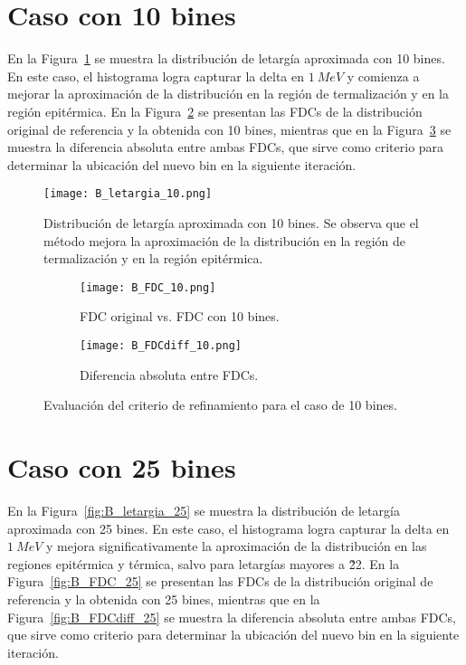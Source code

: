 \section*{Caso con 10 bines}

En la Figura~\ref{fig:B_letargia_10} se muestra la distribución de letargía aproximada con 10 bines. En este caso, el histograma logra capturar la delta en $1~MeV$ y comienza a mejorar la aproximación de la distribución en la región de termalización y en la región epitérmica. En la Figura~\ref{fig:B_FDC_10} se presentan las FDCs de la distribución original de referencia y la obtenida con 10 bines, mientras que en la Figura~\ref{fig:B_FDCdiff_10} se muestra la diferencia absoluta entre ambas FDCs, que sirve como criterio para determinar la ubicación del nuevo bin en la siguiente iteración.

\begin{figure}[H]
    \centering
    \texttt{[image: B\_letargia\_10.png]}
    \caption{Distribución de letargía aproximada con 10 bines. Se observa que el método mejora la aproximación de la distribución en la región de termalización y en la región epitérmica.}
    \label{fig:B_letargia_10}
\end{figure}

\begin{figure}[H]
    \centering
    \begin{subfigure}[b]{0.46\textwidth}
        \texttt{[image: B\_FDC\_10.png]}
        \caption{FDC original vs. FDC con 10 bines.}
        \label{fig:B_FDC_10}
    \end{subfigure}
    \hfill
    \begin{subfigure}[b]{0.46\textwidth}
        \texttt{[image: B\_FDCdiff\_10.png]}
        \caption{Diferencia absoluta entre FDCs.}
        \label{fig:B_FDCdiff_10}
    \end{subfigure}
    \caption{Evaluación del criterio de refinamiento para el caso de 10 bines.}
    \label{fig:B_FDC_10_10}
\end{figure}

\section*{Caso con 25 bines}

En la Figura~\ref{fig:B_letargia_25} se muestra la distribución de letargía aproximada con 25 bines. En este caso, el histograma logra capturar la delta en $1~MeV$ y mejora significativamente la aproximación de la distribución en las regiones epitérmica y térmica, salvo para letargías mayores a \~ 22. En la Figura~\ref{fig:B_FDC_25} se presentan las FDCs de la distribución original de referencia y la obtenida con 25 bines, mientras que en la Figura~\ref{fig:B_FDCdiff_25} se muestra la diferencia absoluta entre ambas FDCs, que sirve como criterio para determinar la ubicación del nuevo bin en la siguiente iteración.

